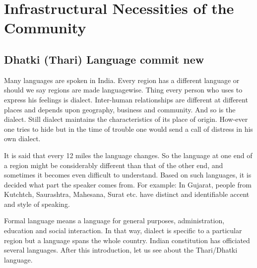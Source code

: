 \chapter{Infrastructural Necessities of the Community}
\section{Dhatki (Thari) Language commit new}
Many languages are spoken in India. Every region has a different language or should we say regions are made languagewise. Thing every person who uses to express his feelings is dialect. Inter-human relationships are different at different places and depends upon geography, business and community. And so is the dialect. Still dialect maintains the characteristics of its place of origin. How-ever one tries to hide but in the time of trouble one would send a call of distress in his own dialect.

It is said that every 12 miles the language changes. So the language at one end of a region might be considerably different than that of the other end, and sometimes it becomes even difficult to understand. Based on such languages, it is decided what part the speaker comes from. For example: In Gujarat, people from Kutchtch, Saurashtra, Mahesana, Surat etc. have distinct and identifiable accent and style of speaking.

Formal language means a language for general purposes, administration, education and social interaction. In that way, dialect is specific to a particular region but a language spans the whole country. Indian constitution has officiated several languages. After this introduction, let us see about the Thari/Dhatki language.

